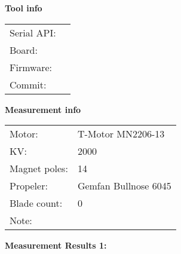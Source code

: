 \documentclass[10pt]{article}
\begin{document}
\noindent
{\large \bf Tool info}
\vspace{3mm}

\noindent
\begin{tabular}{ll}
Serial API:  & \\ 
Board:       & \\ 
Firmware:    & \\ 
Commit:      & 
\end{tabular}
\vspace{3mm}

\noindent
{\large \bf Measurement info}
\vspace{3mm}

\noindent
\begin{tabular}{ll}
Motor:        & T-Motor MN2206-13\\ 
KV:           & 2000\\ 
Magnet poles: & 14\\ 
Propeler:     & Gemfan Bullnose 6045\\ 
Blade count:  & 0\\ 
Note:         & 
\end{tabular}

\vspace{3mm}

\noindent
{\large \bf Measurement Results 1:}
\vspace{3mm}
\end{document}
